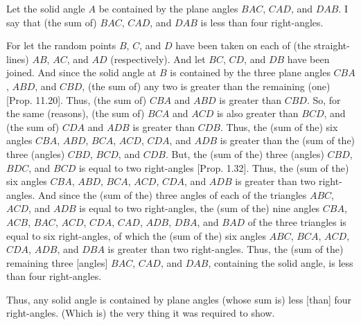 \begin{Parallel}{}{}
{Let the solid angle $A$ be contained by the plane angles $BAC$,
$CAD$, and $DAB$. I say that (the sum of) $BAC$, $CAD$, and $DAB$
is less than four right-angles.

For let the random points $B$, $C$, and $D$ have been taken on each of (the straight-lines)
 $AB$, $AC$, and $AD$ (respectively). And let $BC$, $CD$, and $DB$ have been joined.  And since the solid angle at $B$ is contained
by the three plane angles $CBA$, $ABD$, and $CBD$, (the sum of) any two
is greater than the remaining (one) [Prop. 11.20].
Thus, (the sum of) $CBA$ and $ABD$ is greater than $CBD$. So, for
the same (reasons), (the sum of) $BCA$ and $ACD$ is also greater than
$BCD$, and (the sum of) $CDA$ and $ADB$ is greater than $CDB$.
Thus, the (sum of the) six angles $CBA$, $ABD$, $BCA$, $ACD$, $CDA$,
and $ADB$ is greater than the (sum of the) three (angles) $CBD$, $BCD$,
and $CDB$. But, the (sum of the) three (angles) $CBD$, $BDC$, and
$BCD$ is equal to two right-angles [Prop. 1.32].
Thus, the (sum of the) six angles $CBA$, $ABD$, $BCA$, $ACD$, $CDA$,
and $ADB$ is greater than two right-angles.
And since the (sum of the) three angles of each of the triangles
$ABC$, $ACD$, and $ADB$ is equal to two right-angles, the (sum of the)
nine angles $CBA$, $ACB$, $BAC$, $ACD$, $CDA$, $CAD$, $ADB$,
$DBA$, and $BAD$ of the three triangles is equal to six right-angles,
of which the (sum of the) six angles $ABC$, $BCA$, $ACD$, $CDA$,
$ADB$, and $DBA$ is greater than two right-angles. Thus, the (sum of the)
remaining three [angles] $BAC$, $CAD$, and $DAB$, containing the
solid angle, is less than four right-angles.

Thus, any solid angle is contained by plane angles (whose sum is) less [than]
four  right-angles. (Which is) the very thing it was required to show.}
\end{Parallel}


\vspace{7pt}{\footnotesize\noindent$^\dag$ This proposition is only proved for the case of a solid angle contained by three plane angles. However, the generalization to
a solid angle contained by more than three plane angles is straightforward.}

